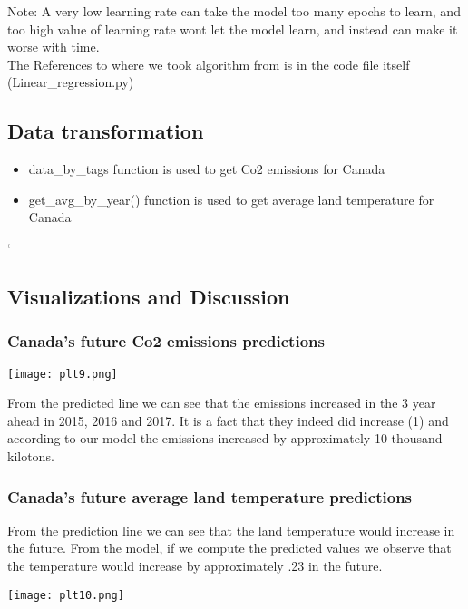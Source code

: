 \documentclass[a4paper, 11pt]{report}
\begin{document}
Note: A very low learning rate can take the model too many epochs to learn,
   and too high value of learning rate wont let the model learn, and instead can
   make it worse with time. \\

   The References to where we took algorithm from is in the code file itself (Linear\_regression.py)

\newpage

\subsection{Data transformation}

\begin{itemize}
    \item data\_by\_tags function is used to get Co2 emissions for Canada

    \item get\_avg\_by\_year() function is used to get average land temperature for Canada
\end{itemize}
`\\

\subsection{Visualizations and Discussion}


\subsubsection{Canada's future Co2 emissions predictions}

\begin{multicols}{2}
  \texttt{[image: plt9.png]}

  From the predicted line we can see that the emissions increased in the 3 year ahead in 2015, 2016 and 2017. It is a fact that they indeed did increase (1) and according to our model the emissions increased by approximately 10 thousand kilotons.
\end{multicols}


\subsubsection{Canada's future average land temperature predictions}

\begin{multicols}{2}
  From the prediction line we can see that the land temperature would increase in the future. From the model, if we compute the predicted values we observe that the temperature would increase by approximately .23 in the future.

  \texttt{[image: plt10.png]}
\end{multicols}
~\\
\end{document}
